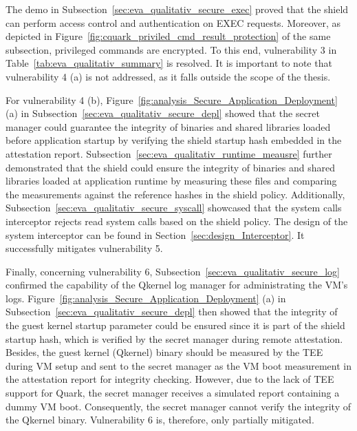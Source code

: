 The demo in Subsection~\ref{sec:eva_qualitativ_secure_exec} proved that the shield can perform access control and authentication on EXEC requests. Moreover, as depicted in Figure~\ref{fig:cquark_priviled_cmd_result_protection} of the same subsection, privileged commands are encrypted. 
To this end, vulnerability 3 in Table~\ref{tab:eva_qualitativ_summary} is resolved. It is important to note that vulnerability 4 (a) is not addressed, as it falls outside the scope of the thesis. 

For vulnerability 4 (b), Figure~\ref{fig:analysis_Secure_Application_Deployment} (a) in Subsection~\ref{sec:eva_qualitativ_secure_depl} showed that the secret manager could guarantee the integrity of binaries and shared libraries loaded before application startup by verifying the shield startup 
hash embedded in the attestation report. Subsection~\ref{sec:eva_qualitativ_runtime_meausre} further demonstrated that the shield could ensure the integrity of binaries and shared libraries loaded at application runtime by measuring these files and comparing the measurements against 
the reference hashes in the shield policy. Additionally, Subsection~\ref{sec:eva_qualitativ_secure_syscall} showcased that the system calls interceptor rejects read system calls based on the shield policy. The design of the system interceptor can be found in Section~\ref{sec:design_Interceptor}. 
It successfully mitigates vulnerability 5. 



Finally, concerning vulnerability 6, Subsection~\ref{sec:eva_qualitativ_secure_log} confirmed the capability of the Qkernel log manager for administrating the VM's logs. Figure~\ref{fig:analysis_Secure_Application_Deployment} (a) in Subsection~\ref{sec:eva_qualitativ_secure_depl} then showed 
that the integrity of the guest kernel startup parameter could be ensured since it is part of the shield startup hash, which is verified by the secret manager during remote attestation. Besides, the guest kernel (Qkernel)  binary should be measured by the TEE during VM 
setup and sent to the secret manager as the VM boot measurement in the attestation report for integrity checking. However, due to the lack of TEE support for Quark, the secret manager receives a simulated report containing a dummy VM boot. Consequently, 
the secret manager cannot verify the integrity of the Qkernel binary. Vulnerability 6 is, therefore, only partially mitigated. 


